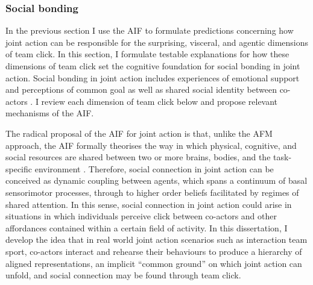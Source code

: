 \begin{CJK}{UTF8}{gbsn}
\subsubsection{Social bonding\label{sect:AIFsocialBondingJA}}
In the previous section I use the AIF to formulate predictions concerning how joint action can be responsible for the surprising, visceral, and agentic dimensions of team click. In this section, I formulate testable explanations for how these dimensions of team click set the cognitive foundation for social bonding in joint action.  Social bonding in joint action includes experiences of emotional support and perceptions of common goal \citep[cf.][]{Dunbar2012,Wolf2015} as well as shared social identity between co-actors \citep{Whitehouse2014}.  I review each dimension of team click below and propose relevant mechanisms of the AIF.




The radical proposal of the AIF for joint action is that, unlike the AFM approach, the AIF formally theorises the way in which physical, cognitive, and social resources are shared between two or more brains, bodies, and the task-specific environment \citep{Clark2015}.  Therefore, social connection in joint action can be conceived as dynamic coupling between agents, which spans a continuum of basal sensorimotor processes, through to higher order beliefs facilitated by regimes of shared attention.  In this sense, social connection in joint action could arise in situations in which individuals perceive click between co-actors and other affordances contained within a certain field of activity.  In this dissertation, I develop the idea that in real world joint action scenarios such as interaction team sport, co-actors interact and rehearse their behaviours to produce a hierarchy of aligned representations, an implicit ``common ground'' \citep[cf.][]{Noy2017} on which joint action can unfold, and social connection may be found through team click.











\end{CJK}

